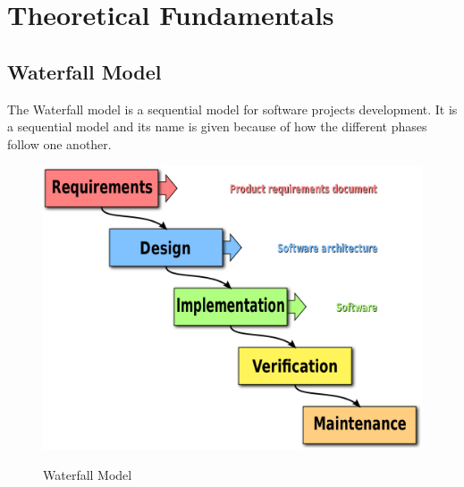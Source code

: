 
\section{Theoretical Fundamentals}

\subsection{Waterfall Model}
The Waterfall model is a sequential model for software projects development. It is a sequential model and its name is given because of how the different phases follow one another.

\begin{figure}[!h]
	\center
	\label{figure3}
	\includegraphics[scale=0.30]{Figures/waterfall} \\
	\caption {Waterfall Model}
\end{figure}

